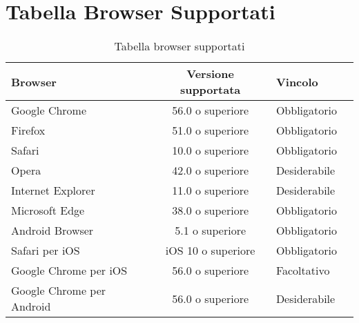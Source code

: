 \section{Tabella Browser Supportati}
\label{Tabella-browser-supportati}
\begin{table}[htbp]
	\begin{center}
		\setlength{\extrarowheight}{\jot}
		\begin{tabular}{|p{4cm}|c|p{2.5cm}|p{2.5cm}|}
			\hline \rowcolor{Gray}
			\textbf{Browser} & \textbf{Versione supportata} & \textbf{Vincolo}\\[1ex]
			\hline
			Google Chrome & 56.0 o superiore & Obbligatorio\\[1ex]
			\hline
			Firefox & 51.0 o superiore & Obbligatorio\\[1ex]
			\hline
			Safari & 10.0 o superiore & Obbligatorio\\[1ex]
			\hline
			Opera & 42.0 o superiore & Desiderabile\\[1ex]
			\hline
			Internet Explorer & 11.0 o superiore & Desiderabile \\[1ex]
			\hline
			Microsoft Edge & 38.0 o superiore & Obbligatorio \\[1ex]
			\hline
			Android Browser & 5.1 o superiore & Obbligatorio \\[1ex]
			\hline
			Safari per iOS & iOS 10 o superiore & Obbligatorio \\[1ex]
			\hline
			Google Chrome per iOS & 56.0 o superiore & Facoltativo\\[1ex]
			\hline
			Google Chrome per Android & 56.0 o superiore & Desiderabile\\[1ex]
			\hline
		\end{tabular}
	\end{center}
	\caption{Tabella browser supportati}
\end{table}
